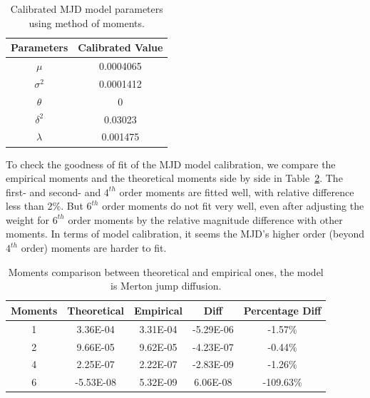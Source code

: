 \documentclass[11pt,reqno,final]{amsart}
\begin{document}
\begin{table}[H]
\begin{center}
\caption{Calibrated MJD model parameters using method of moments.}
\begin{tabular}{c|c}
  \hline \hline
  Parameters & Calibrated Value \\ \hline
  $\mu$ & 0.0004065 \\
  $\sigma^2$ & 0.0001412 \\
  $\theta$ & 0 \\
  $\delta^2$ & 0.03023 \\
  $\lambda$ & 0.001475 \\
  \hline\hline
\end{tabular}\label{tbl::gmm_calibration_parameter}
\end{center}
\end{table}

To check the goodness of fit of the MJD model calibration, we compare the empirical moments and the theoretical moments side by side in Table~\ref{tbl::mom_comp}. The first- and second- and $4^{th}$ order moments are fitted well, with relative difference less than 2\%. But $6^{th}$ order moments do not fit very well, even after adjusting the weight for $6^{th}$ order moments by the relative magnitude difference with other moments. In terms of model calibration, it seems the MJD's higher order (beyond $4^{th}$ order) moments are harder to fit. 

\begin{table}[H]
\begin{center}
\caption{Moments comparison between theoretical and empirical ones, the model is Merton jump diffusion.}
\begin{tabular}{c|c|c|c|c}
  \hline \hline 
Moments	&	Theoretical	&	Empirical	&	Diff	&	Percentage Diff	\\ \hline
1	&	3.36E-04	&	3.31E-04	&	-5.29E-06	&	-1.57\%	\\
2	&	9.66E-05	&	9.62E-05	&	-4.23E-07	&	-0.44\%	\\
4	&	2.25E-07	&	2.22E-07	&	-2.83E-09	&	-1.26\%	\\
6	&	-5.53E-08	&	5.32E-09	&	6.06E-08	&	-109.63\%	\\
  \hline\hline
\end{tabular}\label{tbl::mom_comp}
\end{center}
\end{table}
\end{document}
